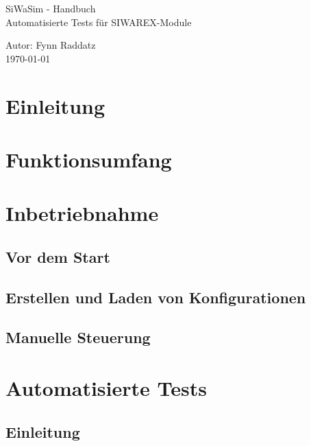 \documentclass[12pt, a4paper]{report}
\begin{document}
    \begin{figure}
        \centering
    \end{figure}
    
   \vspace*{1.2cm}
   \begin{center}
       {\huge SiWaSim - Handbuch}\\[0.8cm]
       \large{Automatisierte Tests für SIWAREX-Module}\\[0.5cm]
	
   \end{center}
   \vfill
   \begin{flushleft}
       \large{Autor: Fynn Raddatz}\\
       \today
       \thispagestyle{empty}
   \end{flushleft}
   \newpage
   \tableofcontents
   \clearpage
   \pagestyle{fancy}

\chapter{Einleitung}
\chapter{Funktionsumfang}
\chapter{Inbetriebnahme}
\section{Vor dem Start}
\section{Erstellen und Laden von Konfigurationen}
\section{Manuelle Steuerung}
\chapter{Automatisierte Tests}
\section{Einleitung}
\end{document}
